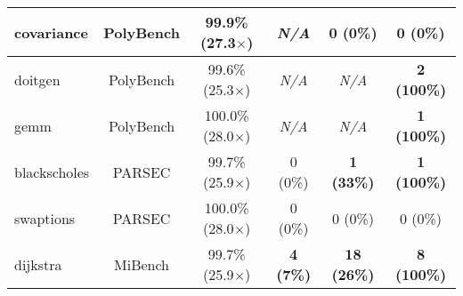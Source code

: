 \begin{tabular}{|l|c|c||c|c||c|}
covariance & PolyBench & 99.9\% (27.3$\times$) & \textit{N/A} & 0 (0\%) & 0 (0\%) \\ %
\hline
doitgen   & PolyBench & 99.6\% (25.3$\times$) & \textit{N/A} & \textit{N/A} & \textbf{2 (100\%)} \\ %
\hline
gemm     & PolyBench  & 100.0\% (28.0$\times$) & \textit{N/A} & \textit{N/A} & \textbf{1 (100\%)} \\ %
\hline
blackscholes & PARSEC & 99.7\% (25.9$\times$) & 0 (0\%) & \textbf{1 (33\%)} & \textbf{1 (100\%)} \\ %
\hline
swaptions & PARSEC & 100.0\% (28.0$\times$)  & 0 (0\%) & 0 (0\%) & 0 (0\%) \\ %
\hline
dijkstra & MiBench  & 99.7\% (25.9$\times$) & \textbf{4 (7\%)} & \textbf{18 (26\%)} & \textbf{8 (100\%)} \\ %
\hline
\end{tabular}